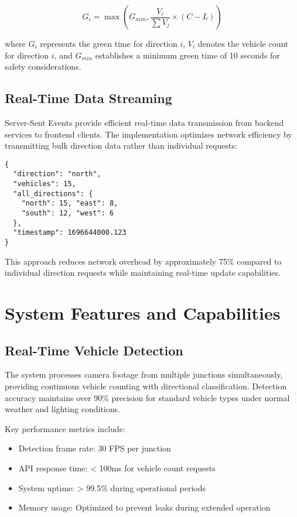\documentclass[conference]{IEEEtran}
\begin{document}
$$G_i = \max(G_{min}, \frac{V_i}{\sum V_j} \times (C - L))$$

where $G_i$ represents the green time for direction $i$, $V_i$ denotes the vehicle count for direction $i$, and $G_{min}$ establishes a minimum green time of 10 seconds for safety considerations.

\subsection{Real-Time Data Streaming}

Server-Sent Events provide efficient real-time data transmission from backend services to frontend clients. The implementation optimizes network efficiency by transmitting bulk direction data rather than individual requests:

\begin{verbatim}
{
  "direction": "north",
  "vehicles": 15,
  "all_directions": {
    "north": 15, "east": 8,
    "south": 12, "west": 6
  },
  "timestamp": 1696644000.123
}
\end{verbatim}

This approach reduces network overhead by approximately 75\% compared to individual direction requests while maintaining real-time update capabilities.

\section{System Features and Capabilities}

\subsection{Real-Time Vehicle Detection}

The system processes camera footage from multiple junctions simultaneously, providing continuous vehicle counting with directional classification. Detection accuracy maintains over 90\% precision for standard vehicle types under normal weather and lighting conditions.

Key performance metrics include:
\begin{itemize}
\item Detection frame rate: 30 FPS per junction
\item API response time: < 100ms for vehicle count requests
\item System uptime: > 99.5\% during operational periods
\item Memory usage: Optimized to prevent leaks during extended operation
\end{itemize}
\end{document}
